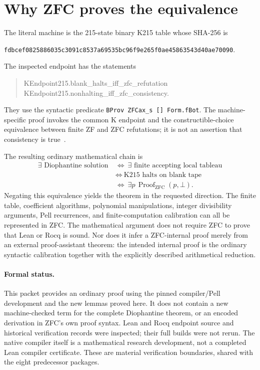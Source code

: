 \documentclass[11pt,a4paper]{article}
\theoremstyle{remark}\newtheorem{remark}[theorem]{Remark}
\begin{document}


\section{Why ZFC proves the equivalence}\label{sec:logic}

The literal machine is the 215-state binary K215 table whose SHA-256 is
\begin{center}\scriptsize\texttt{fdbcef0825886035c3091c8537a69535bc96f9e265f0ae45863543d40ae70090}.\end{center}
The inspected endpoint has the statements
\begin{quote}\small\ttfamily
KEndpoint215.blank\_halts\_iff\_zfc\_refutation\\
KEndpoint215.nonhalting\_iff\_zfc\_consistency.
\end{quote}
They use the syntactic predicate \texttt{BProv ZFCax\_s [] Form.fBot}.
The machine-specific proof invokes the common K endpoint and the
constructible-choice equivalence between finite ZF and ZFC refutations;
it is not an assertion that consistency is true~\cite{k215}.

The resulting ordinary mathematical chain is
\begin{align*}
 \exists\text{ Diophantine solution}
 &\ \Longleftrightarrow\ \exists\text{ finite accepting local tableau}\\
 &\ \Longleftrightarrow\ \text{K215 halts on blank tape}\\
 &\ \Longleftrightarrow\ \exists p\,\operatorname{Proof}_{\mathrm{ZFC}}(p,\bot).
\end{align*}
Negating this equivalence yields the theorem in the requested direction.
The finite table, coefficient algorithms, polynomial manipulations,
integer divisibility arguments, Pell recurrences, and finite-computation
calibration can all be represented in ZFC. The mathematical argument does
not require ZFC to prove that Lean or Rocq is sound. Nor does it infer a
ZFC-internal proof merely from an external proof-assistant theorem:
the intended internal proof is the ordinary syntactic calibration together
with the explicitly described arithmetical reduction.

\paragraph{Formal status.}
This packet provides an ordinary proof using the pinned compiler/Pell
development and the new lemmas proved here. It does not contain a new
machine-checked term for the complete Diophantine theorem, or an encoded
derivation in ZFC's own proof syntax. Lean and Rocq endpoint source and
historical verification records were inspected; their full builds were
not rerun. The native compiler itself is a mathematical research
development, not a completed Lean compiler certificate. These are material
verification boundaries, shared with the eight predecessor packages.
\end{document}
